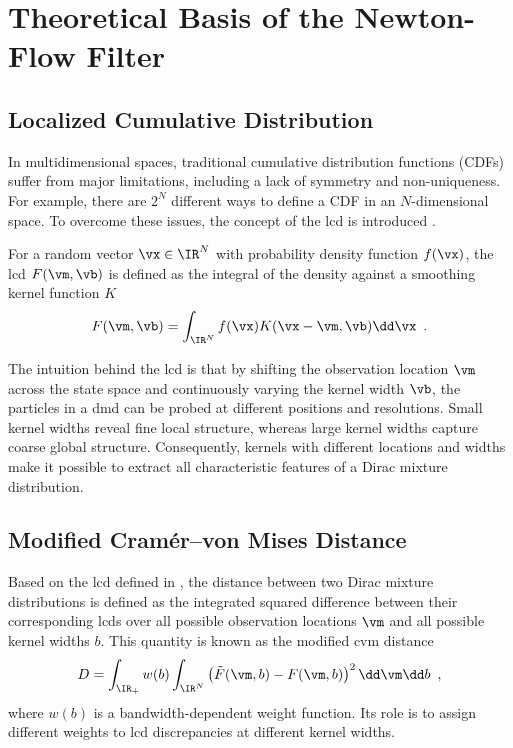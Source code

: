 \section{Theoretical Basis of the Newton-Flow Filter}
\label{sec:newtonflow_theory}

\subsection{Localized Cumulative Distribution}
\label{subsec:lcd}

In multidimensional spaces, traditional cumulative distribution functions (CDFs) suffer from major limitations, including a lack of symmetry and non-uniqueness. For example, there are $2^N$ different ways to define a CDF in an $N$-dimensional space. To overcome these issues, the concept of the \ac{lcd} is introduced \cite{LCD}.

For a random vector $\vx \in \IR^N$ with probability density function $f(\vx)$, the \ac{lcd} $F(\vm, \vb)$ is defined as the integral of the density against a smoothing kernel function $K$
\begin{equation}
	F(\vm, \vb) = \int_{\IR^N} f(\vx) K(\vx-\vm, \vb) \dd\vx \enspace.
	\label{eq:lcd_definition}
\end{equation}

The intuition behind the \ac{lcd} is that by shifting the observation location $\vm$ across the state space and continuously varying the kernel width $\vb$, the particles in a \ac{dmd} can be probed at different positions and resolutions. Small kernel widths reveal fine local structure, whereas large kernel widths capture coarse global structure. Consequently, kernels with different locations and widths make it possible to extract all characteristic features of a Dirac mixture distribution.

\subsection{Modified Cramér--von Mises Distance}
\label{subsec:cvm_distance}

Based on the \ac{lcd} defined in , the distance between two Dirac mixture distributions is defined as the integrated squared difference between their corresponding \ac{lcd}s over all possible observation locations $\vm$ and all possible kernel widths $b$. This quantity is known as the modified \ac{cvm} distance \cite[Sec.~3]{LCD}
\begin{equation}
	D = \int_{\IR_+} w(b) \int_{\IR^N} \left( \tilde{F}(\vm, b) - F(\vm, b) \right)^2 \dd\vm \dd b \enspace,
	\label{eq:cvm_integral}
\end{equation}
where $w(b)$ is a bandwidth-dependent weight function. Its role is to assign different weights to \ac{lcd} discrepancies at different kernel widths.

